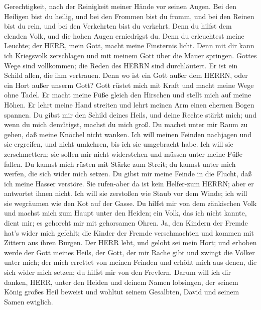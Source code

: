 Gerechtigkeit, nach der Reinigkeit meiner Hände vor seinen Augen.
 Bei den Heiligen bist du heilig, und bei den Frommen bist
du fromm,  und bei den Reinen bist du rein, und bei den
Verkehrten bist du verkehrt.  Denn du hilfst dem elenden
Volk, und die hohen Augen erniedrigst du.  Denn du
erleuchtest meine Leuchte; der HERR, mein Gott, macht meine Finsternis
licht.  Denn mit dir kann ich Kriegsvolk zerschlagen und
mit meinem Gott über die Mauer springen.  Gottes Wege sind
vollkommen; die Reden des HERRN sind durchläutert. Er ist ein Schild
allen, die ihm vertrauen.  Denn wo ist ein Gott außer dem
HERRN, oder ein Hort außer unserm Gott?  Gott rüstet mich
mit Kraft und macht meine Wege ohne Tadel.  Er macht meine
Füße gleich den Hirschen und stellt mich auf meine Höhen. 
Er lehrt meine Hand streiten und lehrt meinen Arm einen ehernen Bogen
spannen.  Du gibst mir den Schild deines Heils, und deine
Rechte stärkt mich; und wenn du mich demütigst, machst du mich groß.
 Du machst unter mir Raum zu gehen, daß meine Knöchel nicht
wanken.  Ich will meinen Feinden nachjagen und sie
ergreifen, und nicht umkehren, bis ich sie umgebracht habe.
 Ich will sie zerschmettern; sie sollen mir nicht
widerstehen und müssen unter meine Füße fallen.  Du kannst
mich rüsten mit Stärke zum Streit; du kannst unter mich werfen, die sich
wider mich setzen.  Du gibst mir meine Feinde in die
Flucht, daß ich meine Hasser verstöre.  Sie rufen-aber da
ist kein Helfer-zum HERRN; aber er antwortet ihnen nicht. 
Ich will sie zerstoßen wie Staub vor dem Winde; ich will sie wegräumen
wie den Kot auf der Gasse.  Du hilfst mir von dem
zänkischen Volk und machst mich zum Haupt unter den Heiden; ein Volk,
das ich nicht kannte, dient mir;  es gehorcht mir mit
gehorsamen Ohren. Ja, den Kindern der Fremde hat's wider mich gefehlt;
 die Kinder der Fremde verschmachten und kommen mit Zittern
aus ihren Burgen.  Der HERR lebt, und gelobt sei mein Hort;
und erhoben werde der Gott meines Heils,  der Gott, der mir
Rache gibt und zwingt die Völker unter mich;  der mich
errettet von meinen Feinden und erhöht mich aus denen, die sich wider
mich setzen; du hilfst mir von den Frevlern.  Darum will
ich dir danken, HERR, unter den Heiden und deinem Namen lobsingen,
 der seinem König großes Heil beweist und wohltut seinem
Gesalbten, David und seinem Samen ewiglich.

